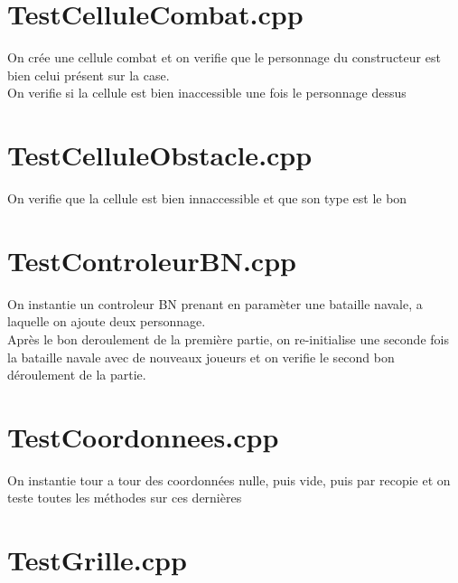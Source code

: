     \section{TestCelluleCombat.cpp}
        On crée une cellule combat et on verifie que le personnage du constructeur est bien celui présent sur la case.\\
        On verifie si la cellule est bien inaccessible une fois le personnage dessus
    \section{TestCelluleObstacle.cpp}
        On verifie que la cellule est bien innaccessible et que son type est le bon
    \section{TestControleurBN.cpp}
        On instantie un controleur BN prenant en paramèter une bataille navale, a laquelle on ajoute deux personnage.\\
        Après le bon deroulement de la première partie, on re-initialise une seconde fois la bataille navale avec de nouveaux joueurs et on verifie le second bon déroulement de la partie.
    \section{TestCoordonnees.cpp}
        On instantie tour a tour des coordonnées nulle, puis vide, puis par recopie et on teste toutes les méthodes sur ces dernières
    \section{TestGrille.cpp}
